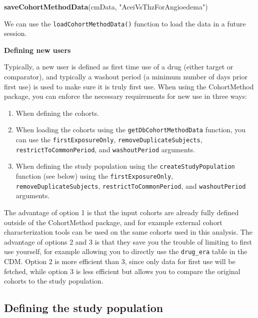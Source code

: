 \documentclass[11pt]{book}
\newenvironment{Shaded}{\begin{snugshade}}{\end{snugshade}}
\newcommand{\KeywordTok}[1]{\textcolor[rgb]{0.13,0.29,0.53}{\textbf{#1}}}
\newcommand{\StringTok}[1]{\textcolor[rgb]{0.31,0.60,0.02}{#1}}
\newcommand{\NormalTok}[1]{#1}
\providecommand{\tightlist}{%
  \setlength{\itemsep}{0pt}\setlength{\parskip}{0pt}}
\begin{document}
\begin{Shaded}
\begin{Highlighting}[]
\KeywordTok{saveCohortMethodData}\NormalTok{(cmData, }\StringTok{"AceiVsThzForAngioedema"}\NormalTok{)}
\end{Highlighting}
\end{Shaded}

We can use the \texttt{loadCohortMethodData()} function to load the data
in a future session.

\textbf{Defining new users}

Typically, a new user is defined as first time use of a drug (either
target or comparator), and typically a washout period (a minimum number
of days prior first use) is used to make sure it is truly first use.
When using the CohortMethod package, you can enforce the necessary
requirements for new use in three ways:

\begin{enumerate}
\def\labelenumi{\arabic{enumi}.}
\tightlist
\item
  When defining the cohorts.
\item
  When loading the cohorts using the \texttt{getDbCohortMethodData}
  function, you can use the \texttt{firstExposureOnly},
  \texttt{removeDuplicateSubjects}, \texttt{restrictToCommonPeriod}, and
  \texttt{washoutPeriod} arguments.
\item
  When defining the study population using the
  \texttt{createStudyPopulation} function (see below) using the
  \texttt{firstExposureOnly}, \texttt{removeDuplicateSubjects},
  \texttt{restrictToCommonPeriod}, and \texttt{washoutPeriod} arguments.
\end{enumerate}

The advantage of option 1 is that the input cohorts are already fully
defined outside of the CohortMethod package, and for example external
cohort characterization tools can be used on the same cohorts used in
this analysis. The advantage of options 2 and 3 is that they save you
the trouble of limiting to first use yourself, for example allowing you
to directly use the \texttt{drug\_era} table in the CDM. Option 2 is
more efficient than 3, since only data for first use will be fetched,
while option 3 is less efficient but allows you to compare the original
cohorts to the study population.

\subsection{Defining the study
population}\label{defining-the-study-population}
\end{document}
